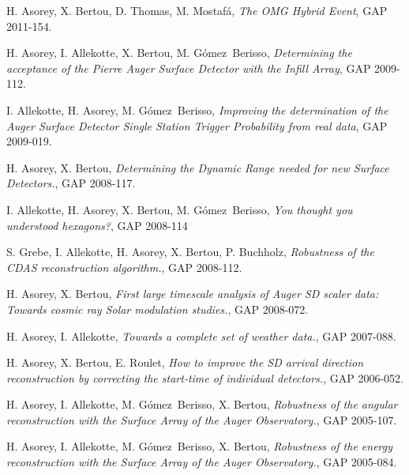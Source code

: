 \begin{etaremune}
\item {}H. Asorey, X. Bertou, D. Thomas, M. Mostafá, {\emph{The OMG Hybrid Event}}, GAP 2011-154.

\item {}H. Asorey, I. Allekotte, X. Bertou, M. Gómez~Berisso, {\emph{Determining the acceptance of the Pierre Auger Surface Detector with the Infill Array}}, GAP 2009-112.

\item {}I. Allekotte, H. Asorey, M. Gómez~Berisso, {\emph{Improving the determination of the Auger Surface Detector Single Station Trigger Probability from real data}}, GAP 2009-019.

\item {}H. Asorey, X. Bertou, {\emph{Determining the Dynamic Range needed for new Surface Detectors.}}, GAP 2008-117.

\item {}I. Allekotte, H. Asorey, X. Bertou, M. Gómez~Berisso, {\emph{You thought you understood hexagons?}}, GAP 2008-114

\item {}S. Grebe, I. Allekotte, H. Asorey, X. Bertou, P. Buchholz, {\emph{Robustness of the CDAS reconstruction algorithm.}}, GAP 2008-112.

\item {}H. Asorey, X. Bertou, {\emph{First large timescale analysis of Auger SD scaler data: Towards cosmic ray Solar modulation studies.}}, GAP 2008-072.

\item {}H. Asorey, I. Allekotte, {\emph{Towards a complete set of weather data.}}, GAP 2007-088.

\item {}H. Asorey, X. Bertou, E. Roulet, {\emph{How to improve the SD arrival direction reconstruction by correcting the start-time of individual detectors.}}, GAP 2006-052.

\item {}H. Asorey, I. Allekotte, M. Gómez~Berisso, X. Bertou, {\emph{Robustness of the angular reconstruction with the Surface Array of the Auger Observatory.}}, GAP 2005-107.

\item {}H. Asorey, I. Allekotte, M. Gómez~Berisso, X. Bertou, {\emph{Robustness of the energy reconstruction with the Surface Array of the Auger Observatory.}}, GAP 2005-084.
\end{etaremune}
